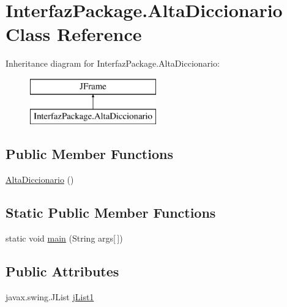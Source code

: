 \hypertarget{class_interfaz_package_1_1_alta_diccionario}{}\section{Interfaz\+Package.\+Alta\+Diccionario Class Reference}
\label{class_interfaz_package_1_1_alta_diccionario}
Inheritance diagram for Interfaz\+Package.\+Alta\+Diccionario\+:\begin{figure}[H]
\begin{center}
\leavevmode
\includegraphics[height=2.000000cm]{class_interfaz_package_1_1_alta_diccionario}
\end{center}
\end{figure}
\subsection*{Public Member Functions}
\begin{DoxyCompactItemize}
\item 
\mbox{\hyperlink{class_interfaz_package_1_1_alta_diccionario_aca3c4675d4f19e6226268ada6f573ae3}{Alta\+Diccionario}} ()
\end{DoxyCompactItemize}
\subsection*{Static Public Member Functions}
\begin{DoxyCompactItemize}
\item 
static void \mbox{\hyperlink{class_interfaz_package_1_1_alta_diccionario_a6eb9af24cf87d8c74da5ffe0a368a8cc}{main}} (String args\mbox{[}$\,$\mbox{]})
\end{DoxyCompactItemize}
\subsection*{Public Attributes}
\begin{DoxyCompactItemize}
\item 
javax.\+swing.\+J\+List \mbox{\hyperlink{class_interfaz_package_1_1_alta_diccionario_a3d36802178dd91d9914cda26ede50e4e}{j\+List1}}
\end{DoxyCompactItemize}
